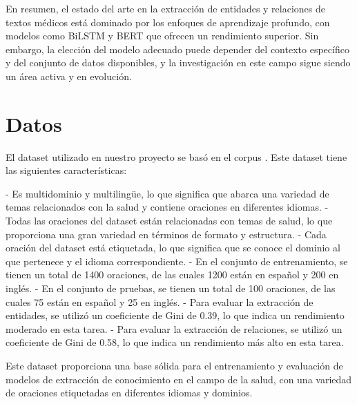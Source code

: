 \documentclass[10pt]{article} %
\begin{document}
	En resumen, el estado del arte en la extracción de entidades y relaciones de textos médicos está dominado por los enfoques de aprendizaje profundo, con modelos como BiLSTM y BERT que ofrecen un rendimiento superior. Sin embargo, la elección del modelo adecuado puede depender del contexto específico y del conjunto de datos disponibles, y la investigación en este campo sigue siendo un área activa y en evolución.
	
	
	\section{Datos}
	El dataset utilizado en nuestro proyecto se basó en el corpus . Este dataset tiene las siguientes características:
	
	- Es multidominio y multilingüe, lo que significa que abarca una variedad de temas relacionados con la salud y contiene oraciones en diferentes idiomas.
	- Todas las oraciones del dataset están relacionadas con temas de salud, lo que proporciona una gran variedad en términos de formato y estructura.
	- Cada oración del dataset está etiquetada, lo que significa que se conoce el dominio al que pertenece y el idioma correspondiente.
	- En el conjunto de entrenamiento, se tienen un total de 1400 oraciones, de las cuales 1200 están en español y 200 en inglés.
	- En el conjunto de pruebas, se tienen un total de 100 oraciones, de las cuales 75 están en español y 25 en inglés.
	- Para evaluar la extracción de entidades, se utilizó un coeficiente de Gini de 0.39, lo que indica un rendimiento moderado en esta tarea.
	- Para evaluar la extracción de relaciones, se utilizó un coeficiente de Gini de 0.58, lo que indica un rendimiento más alto en esta tarea.
	
	Este dataset proporciona una base sólida para el entrenamiento y evaluación de modelos de extracción de conocimiento en el campo de la salud, con una variedad de oraciones etiquetadas en diferentes idiomas y dominios.
	
\end{document}
